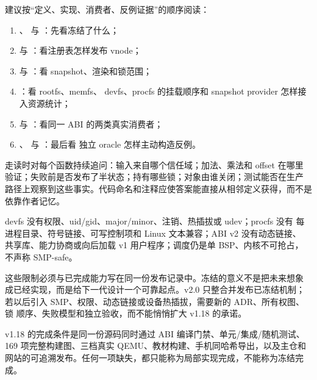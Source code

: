 建议按“定义、实现、消费者、反例证据”的顺序阅读：

\begin{enumerate}[leftmargin=2.1em]
  \item {}、
         与 ：先看冻结了什么；
  \item {} 与
        ：看注册表怎样发布 vnode；
  \item {} 与
        ：看 snapshot、渲染和锁范围；
  \item {}：看 rootfs、memfs、
        devfs、procfs 的挂载顺序和 snapshot provider 怎样接入资源统计；
  \item {} 与
        ：看同一 ABI 的两类真实消费者；
  \item {}、
         与
        ：最后看
        独立 oracle 怎样主动构造反例。
\end{enumerate}

走读时对每个函数持续追问：输入来自哪个信任域；加法、乘法和 offset 在哪里
验证；失败前是否发布了半状态；持有哪些锁；对象由谁关闭；测试能否在生产
路径上观察到这些事实。代码命名和注释应使答案能直接从相邻定义获得，而不是
依靠作者记忆。

devfs 没有权限、uid/gid、major/minor、注销、热插拔或 udev；procfs 没有
每进程目录、符号链接、可写控制项和 Linux 文本兼容；ABI v2 没有动态链接、
共享库、能力协商或向后加载 v1 用户程序；调度仍是单 BSP、内核不可抢占，
不声称 SMP-safe。

这些限制必须与已完成能力写在同一份发布记录中。冻结的意义不是把未来想象
成已经实现，而是给下一代设计一个可靠起点。v2.0 只整合并发布已冻结机制；
若以后引入 SMP、权限、动态链接或设备热插拔，需要新的 ADR、所有权图、锁
顺序、失败模型和独立验收，而不能悄悄扩大 v1.18 的承诺。

\begin{contractbox}
v1.18 的完成条件是同一份源码同时通过 ABI 编译门禁、单元/集成/随机测试、
169 项完整构建图、三档真实 QEMU、教材构建、手机同哈希导出，以及主仓和
网站的可追溯发布。任何一项缺失，都只能称为局部实现完成，不能称为冻结完成。
\end{contractbox}
